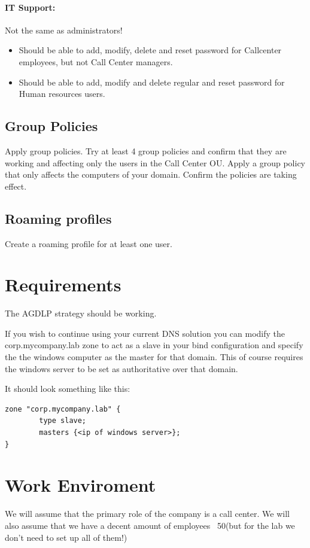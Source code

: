 \documentclass[paper=a4, fontsize=11pt]{report} %
\begin{document}
\paragraph{IT Support:}
Not the same as administrators!
\begin{itemize}
	\item Should be able to add, modify, delete and reset password for Callcenter employees, but not Call Center managers.
	\item Should be able to add, modify and delete regular and reset password for Human resources users.
\end{itemize}

\subsection{Group Policies}
Apply group policies. Try at least 4 group policies and confirm that they are working and affecting only the users in the Call Center OU.
Apply a group policy that only affects the computers of your domain.
Confirm the policies are taking effect.

\subsection{Roaming profiles}
Create a roaming profile for at least one user.

\section{Requirements}
The AGDLP strategy should be working.

If you wish to continue using your current DNS solution you can modify the corp.mycompany.lab zone to act as a slave in your bind configuration and specify the the windows computer as the master for that domain. This of course requires the windows server to be set as  authoritative over that domain.

It should look something like this:
\begin{lstlisting}[style=BashInputStyle]
zone "corp.mycompany.lab" {
    	type slave;
    	masters {<ip of windows server>};
}
\end{lstlisting}
\section{Work Enviroment}
We will assume that the primary role of the company is a call center. We will also assume that we have a decent amount of employees ~50(but for the lab we don’t need to set up all of them!)
\end{document}
